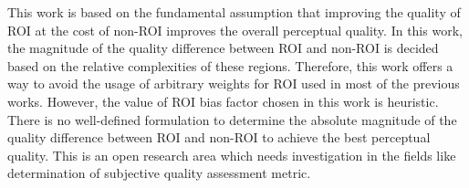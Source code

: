 This work is based on the fundamental assumption that improving the quality of ROI at the cost of non-ROI improves the overall perceptual quality. In this work, the magnitude of the quality difference between ROI and non-ROI is decided based on the relative complexities of these regions. Therefore, this work offers a way to avoid the usage of arbitrary weights for ROI used in most of the previous works. However, the value of ROI bias factor chosen in this work is heuristic. There is no well-defined formulation to determine the absolute magnitude of the quality difference between ROI and non-ROI to achieve the best perceptual quality. This is an open research area which needs investigation in the fields like determination of subjective quality assessment metric.